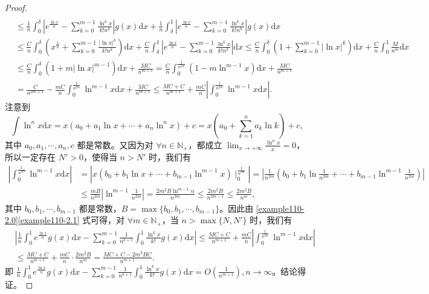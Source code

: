 \documentclass[lang=cn,newtx,10pt,scheme=chinese]{elegantbook}
\begin{document}
\begin{proof}
\begin{align}
\\
&\leqslant \frac{1}{n}\int_0^{\delta}{\left| e^{\frac{\ln x}{n}}-\sum_{k=0}^{m-1}{\frac{\ln ^kx}{k!n^k}} \right|g\left( x \right) \mathrm{d}x}+\frac{1}{n}\int_{\delta}^1{\left| e^{\frac{\ln x}{n}}-\sum_{k=0}^{m-1}{\frac{\ln ^kx}{k!n^k}} \right|g\left( x \right) \mathrm{d}x}
\nonumber
\\
&\leqslant \frac{C}{n}\int_0^{\delta}{\left( x^{\frac{1}{n}}+\sum_{k=0}^{m-1}{\frac{\left| \ln x \right|^k}{k!n^k}} \right) \mathrm{d}x}+\frac{C}{n}\int_{\delta}^1{\left| e^{\frac{\ln x}{n}}-\sum_{k=0}^{m-1}{\frac{\ln ^kx}{k!n^k}} \right|\mathrm{d}x}\leqslant \frac{C}{n}\int_0^{\delta}{\left( 1+\sum_{k=0}^{m-1}{\left| \ln x \right|^k} \right) \mathrm{d}x}+\frac{C}{n}\int_0^1{\frac{M}{n^m}\mathrm{d}x}
\nonumber
\\
&\leqslant \frac{C}{n}\int_0^{\delta}{\left( 1+m\left| \ln x \right|^{m-1} \right) \mathrm{d}x}+\frac{MC}{n^{m+1}}=\frac{C}{n}\int_0^{\frac{1}{n^{2m}}}{\left( 1-m\ln ^{m-1}x \right) \mathrm{d}x}+\frac{MC}{n^{m+1}}
\nonumber
\\
&=\frac{C}{n^{2m+1}}-\frac{mC}{n}\int_0^{\frac{1}{n^{2m}}}{\ln ^{m-1}x\mathrm{d}x}+\frac{MC}{n^{m+1}}\leqslant \frac{MC+C}{n^{m+1}}+\frac{mC}{n}\left| \int_0^{\frac{1}{n^{2m}}}{\ln ^{m-1}x\mathrm{d}x} \right|.\label{example110-2.0}
\end{align}
注意到
\[
\int\ln^n x\mathrm{d}x=x\left(a_0 + a_1\ln x+\cdots + a_n\ln^n x\right)+c=x\left(a_0+\sum_{k = 1}^{n}a_k\ln k\right)+c,
\]
其中 \(a_0,a_1,\cdots,a_n,c\) 都是常数。又因为对 \(\forall n\in\mathbb{N}_+\)，都成立 \(\lim_{x\rightarrow +\infty}\frac{\ln^n x}{x}=0\)，所以一定存在 \(N'>0\)，使得当 \(n > N'\) 时，我们有
\begin{align}
\left| \int_0^{\frac{1}{n^{2m}}}{\ln ^{m-1}x\mathrm{d}x} \right|&=\left| x\left( b_0+b_1\ln x+\cdots +b_{m-1}\ln ^{m-1}x \right) \mid_{0}^{\frac{1}{n^{2m}}} \right|=\left| \frac{1}{n^{2m}}\left( b_0+b_1\ln \frac{1}{n^{2m}}+\cdots +b_{m-1}\ln ^{m-1}\frac{1}{n^{2m}} \right) \right|
\nonumber
\\
&\leqslant \frac{mB}{n^{2m}}\left| \ln ^{m-1}\frac{1}{n^{2m}} \right|=\frac{2m^2B\ln ^{m-1}n}{n^{2m}}\leqslant \frac{2m^2B}{n^{2m-1}}\leqslant \frac{2m^2B}{n^m},\label{example110-2.1}
\end{align}
其中 \(b_0,b_1,\cdots,b_{m - 1}\) 都是常数，\(B = \max\{b_0,b_1,\cdots,b_{m - 1}\}\)。因此由 \eqref{example110-2.0}\eqref{example110-2.1} 式可得，对 \(\forall m\in\mathbb{N}_+\)，当 \(n>\max\{N,N'\}\) 时，我们有
\begin{align*}
&\left|\frac{1}{n}\int_{0}^{1}e^{\frac{\ln x}{n}}g(x)\mathrm{d}x-\sum_{k = 0}^{m - 1}\frac{1}{n^{k + 1}}\int_{0}^{1}\frac{\ln^k x}{k!}g(x)\mathrm{d}x\right|
\leqslant\frac{MC + C}{n^{m + 1}}+\frac{mC}{n}\left|\int_{0}^{\frac{1}{n^{2m}}}\ln^{m - 1}x\mathrm{d}x\right|
\\
&\leqslant\frac{MC + C}{n^{m + 1}}+\frac{mC}{n}\cdot\frac{2m^2B}{n^m}
=\frac{MC + C-2m^3BC}{n^{m + 1}}.
\end{align*}
即 \(\frac{1}{n}\int_{0}^{1}e^{\frac{\ln x}{n}}g(x)\mathrm{d}x-\sum_{k = 0}^{m - 1}\frac{1}{n^{k + 1}}\int_{0}^{1}\frac{\ln^k x}{k!}g(x)\mathrm{d}x=O\left(\frac{1}{n^{m + 1}}\right),n\rightarrow\infty\)。结论得证。
\end{proof}
\end{document}
